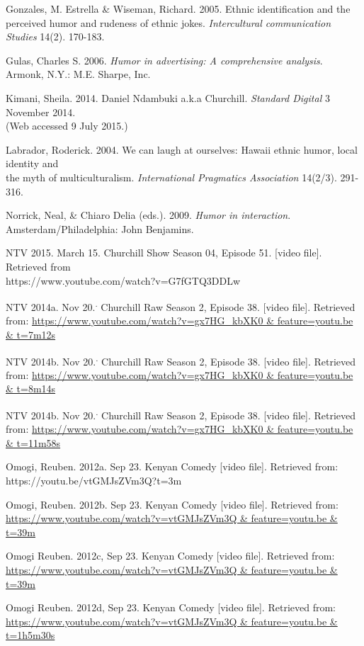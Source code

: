 \documentclass[output=paper]{langsci/langscibook}
\begin{document}
Gonzales, M. Estrella \& Wiseman, Richard. 2005. Ethnic identification and the perceived humor and rudeness of ethnic jokes. \textit{Intercultural communication Studies} 14(2).  170-183.

Gulas, Charles S. 2006. \textit{Humor in advertising: A comprehensive analysis}. Armonk, N.Y.: M.E. Sharpe, Inc.

Kimani, Sheila. 2014. Daniel Ndambuki a.k.a Churchill. \textit{Standard Digital} 3 November 2014. \\
   (Web accessed 9 July 2015.)

Labrador, Roderick. 2004. We can laugh at ourselves: Hawaii ethnic humor, local identity and \\
   the myth of multiculturalism. \textit{International Pragmatics Association }14(2/3). 291-316.

Norrick, Neal, \& Chiaro Delia (eds.). 2009. \textit{Humor in interaction}. Amsterdam/Philadelphia: John Benjamins.

NTV 2015. March 15. Churchill Show Season 04, Episode 51. [video file]. Retrieved from \\
   https://www.youtube.com/watch?v=G7fGTQ3DDLw

NTV 2014a. Nov 20.\textsuperscript{. }Churchill Raw Season 2, Episode 38. [video file]. Retrieved from: \url{https://www.youtube.com/watch?v=gx7HG_kbXK0 & feature=youtu.be & t=7m12s}

NTV 2014b. Nov 20.\textsuperscript{. }Churchill Raw Season 2, Episode 38. [video file]. Retrieved from: \url{https://www.youtube.com/watch?v=gx7HG_kbXK0 & feature=youtu.be & t=8m14s}

NTV 2014b. Nov 20.\textsuperscript{. }Churchill Raw Season 2, Episode 38. [video file]. Retrieved from: \url{https://www.youtube.com/watch?v=gx7HG_kbXK0 & feature=youtu.be & t=11m58s}

Omogi, Reuben. 2012a. Sep 23. Kenyan Comedy [video file]. Retrieved from: https://youtu.be/vtGMJsZVm3Q?t=3m

Omogi, Reuben. 2012b. Sep 23. Kenyan Comedy [video file]. Retrieved from: \url{https://www.youtube.com/watch?v=vtGMJsZVm3Q & feature=youtu.be & t=39m}

Omogi Reuben. 2012c, Sep 23. Kenyan Comedy [video file]. Retrieved from: \url{https://www.youtube.com/watch?v=vtGMJsZVm3Q & feature=youtu.be & t=39m}

Omogi Reuben. 2012d, Sep 23. Kenyan Comedy [video file]. Retrieved from: \url{https://www.youtube.com/watch?v=vtGMJsZVm3Q & feature=youtu.be & t=1h5m30s}
\end{document}
